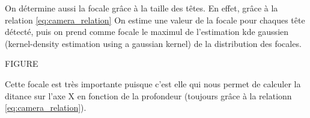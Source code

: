 

On détermine aussi la focale grâce à la taille des têtes. En effet, grâce à la relation \ref{eq:camera_relation} On estime une valeur de la focale pour chaques tête détecté, puis on prend comme focale le maximul de l'estimation kde gaussien (kernel-density estimation using a gaussian kernel) de la distribution des focales.

FIGURE

Cette focale est très importante puisque c'est elle qui nous permet de calculer la ditance sur l'axe X en fonction de la profondeur (toujours grâce à la relationn \ref{eq:camera_relation}).